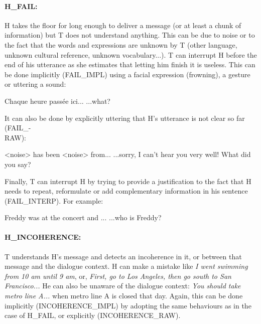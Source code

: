         \paragraph{H\_FAIL:} H takes the floor for long enough to deliver a message (or at least a chunk of information) but T does not understand anything. This can be due to noise or to the fact that the words and expressions are unknown by T (other language, unknown cultural reference, unknown vocabulary...). T can interrupt H before the end of his utterance as she estimates that letting him finish it is useless. This can be done implicitly (FAIL\_IMPL) using a facial expression (frowning), a gesture or uttering a sound:
				
					\begin{dialogue}
						 Chaque heure passée ici...
						 ...what?
					\end{dialogue}
					
					It can also be done by explicitly uttering that H's utterance is not clear so far (FAIL\_-\\RAW):
					
					\begin{dialogue}
						 <noise> has been <noise> from...
						 ...sorry, I can't hear you very well! What did you say?
					\end{dialogue}
					
					Finally, T can interrupt H by trying to provide a justification to the fact that H needs to repeat, reformulate or add complementary information in his sentence (FAIL\_INTERP). For example:
					
					\begin{dialogue}
						 Freddy was at the concert and ...
						 ...who is Freddy?
					\end{dialogue}
					
				\paragraph{H\_INCOHERENCE:} T understands H's message and detects an incoherence in it, or between that message and the dialogue context. H can make a mistake like \textit{I went swimming from 10 am until 9 am}, or, \textit{First, go to Los Angeles, then go south to San Francisco...} He can also be unaware of the dialogue context: \textit{You should take metro line A...} when metro line A is closed that day. Again, this can be done implicitly (INCOHERENCE\_IMPL) by adopting the same behaviours as in the case of H\_FAIL, or explicitly (INCOHERENCE\_RAW).
					
